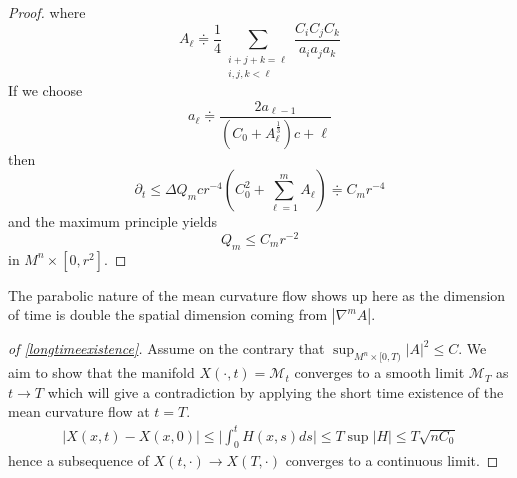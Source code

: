 \begin{proof}
where
$$
A_{\ell} \doteqdot \frac{1}{4} \sum_{\substack{i+j+k=\ell \\ i, j, k<\ell}} \frac{C_i C_j C_k}{a_i a_j a_k}
$$
If we choose
$$
a_{\ell} \doteqdot \frac{2 a_{\ell-1}}{\left(C_0+A_{\ell}^{\frac{1}{3}}\right) c+\ell}
$$
then
$$
\partial_t \leq \Delta Q_m  c r^{-4}\left(C_0^2+\sum_{\ell=1}^m A_{\ell}\right) \doteqdot C_m r^{-4}
$$
and the maximum principle yields
$$
Q_m \leq C_m r^{-2}
$$
in $M^n \times\left[0, r^2\right]$.

\end{proof}

\begin{remark}
    The parabolic nature of the mean curvature flow shows up here as the dimension of time is double the spatial dimension coming from $ |\nabla^{m}A| $.
\end{remark}
\begin{proof}[ of \cref{longtimeexistence}]
    Assume on the contrary that $ \sup_{M^{n} \times [0, T)}|A|^{2} \le C $. We aim to show that the manifold $X(\cdot, t)= \mathcal{M}_{t} $ converges to a smooth limit $ \mathcal{M}_{T} $ as $ t \to T $ which will give a contradiction by applying the short time existence of the mean curvature flow at $ t  = T $. \begin{align*}
        |X(x,t)-X(x,0)| \le  \bigg|\int_{0}^{t} H(x,s) ds \bigg| \le T \sup |H| \le T \sqrt{nC_{0}}
    \end{align*}
    hence a subsequence of $ X(t, \cdot) \to X(T, \cdot) $ converges to a continuous limit. 
\end{proof}

